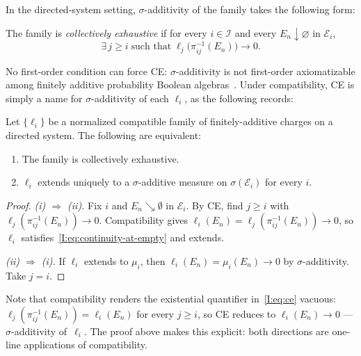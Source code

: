 \noindent In the directed-system setting, $\sigma$-additivity of the
family takes the following form:

\begin{definition}
\label{I:def:collectively-exhaustive}
The family is \emph{collectively exhaustive} if for every
$i \in \mathcal{I}$ and every $E_n \downarrow \varnothing$ in
$\mathcal{E}_i$,
\[
  \exists\, j \geq i \;\text{such that}\;
  \ell_j\!\bigl(\pi_{ij}^{-1}(E_n)\bigr) \to 0.
\]
\end{definition}

\noindent No first-order condition can force CE:
$\sigma$-additivity is not first-order axiomatizable among finitely
additive probability Boolean algebras~\cite{FaginHalpernMegiddo1990, Los1955}.
Under compatibility, CE is simply a name for $\sigma$-additivity of each
$\ell_i$, as the following records:

\begin{proposition}[CE Characterisation]
\label{I:thm:sp1}
Let $\{\ell_i\}$ be a normalized compatible family of finitely-additive
charges on a directed system.  The following are equivalent:
\begin{enumerate}[label=(\roman*)]
  \item The family is collectively exhaustive.
  \item $\ell_i$ extends uniquely to a $\sigma$-additive measure on
        $\sigma(\mathcal{E}_i)$ for every $i$.
\end{enumerate}
\end{proposition}

\begin{proof}
\emph{(i) $\Rightarrow$ (ii).}
Fix $i$ and $E_n \searrow \emptyset$ in $\mathcal{E}_i$.  By CE, find
$j \geq i$ with $\ell_j(\pi_{ij}^{-1}(E_n)) \to 0$.
Compatibility gives $\ell_i(E_n) = \ell_j(\pi_{ij}^{-1}(E_n)) \to 0$,
so $\ell_i$ satisfies~\eqref{I:eq:continuity-at-empty} and extends.

\emph{(ii) $\Rightarrow$ (i).}
If $\ell_i$ extends to $\mu_i$, then $\ell_i(E_n) = \mu_i(E_n) \to 0$
by $\sigma$-additivity.  Take $j = i$.
\end{proof}

\noindent
Note that compatibility renders the existential quantifier
in~\eqref{I:eq:ce} vacuous:
$\ell_j(\pi_{ij}^{-1}(E_n)) = \ell_i(E_n)$ for every $j \geq i$, so
CE reduces to $\ell_i(E_n) \to 0$ ---
$\sigma$-additivity of~$\ell_i$.  The proof
above makes this explicit: both directions are one-line applications of
compatibility.

